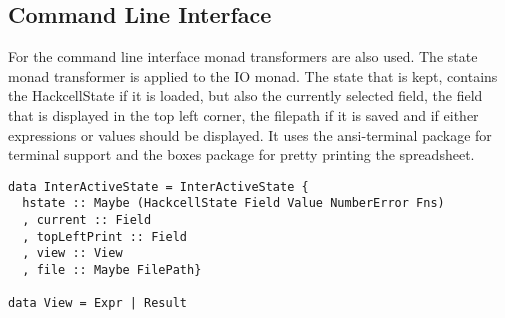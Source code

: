 \documentclass{article}
\begin{document}
	\subsection{Command Line Interface}
	For the command line interface monad transformers are also used. The state monad transformer is applied to the IO monad. The state that is kept, contains the HackcellState if it is loaded, but also the currently selected field, the field that is displayed in the top left corner, the filepath if it is saved and if either expressions or values should be displayed. It uses the ansi-terminal package for terminal support and the boxes package for pretty printing the spreadsheet.
	\begin{verbatim}
data InterActiveState = InterActiveState {
  hstate :: Maybe (HackcellState Field Value NumberError Fns)
  , current :: Field
  , topLeftPrint :: Field
  , view :: View
  , file :: Maybe FilePath}

data View = Expr | Result
	\end{verbatim}
	
	
	
\end{document}

